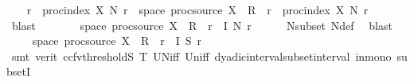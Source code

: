 \begin{isabellebody}
\ \ \isamarkupfalse%
\ {\isachardoublequoteopen}{\isacharparenleft}{\kern0pt}{\isasymUnion}r\ {\isasymin}\ proc{\isacharunderscore}{\kern0pt}index\ X{\isachardot}{\kern0pt}\ N\ r{\isacharparenright}{\kern0pt}\ {\isasymsubseteq}\ {\isacharparenleft}{\kern0pt}space\ {\isacharparenleft}{\kern0pt}proc{\isacharunderscore}{\kern0pt}source\ X{\isacharparenright}{\kern0pt}\ {\isacharminus}{\kern0pt}\ R{\isacharparenright}{\kern0pt}\ {\isasymunion}\ {\isacharparenleft}{\kern0pt}{\isasymUnion}r\ {\isasymin}\ proc{\isacharunderscore}{\kern0pt}index\ X{\isachardot}{\kern0pt}\ N\ r{\isacharparenright}{\kern0pt}{\isachardoublequoteclose}\isanewline
\ \ \ \ \isamarkupfalse%
\ blast\isanewline
\ \ \isamarkupfalse%
\ \isamarkupfalse%
\ {\isachardoublequoteopen}{\isachardot}{\kern0pt}{\isachardot}{\kern0pt}{\isachardot}{\kern0pt}\ {\isasymsubseteq}\ {\isacharparenleft}{\kern0pt}space\ {\isacharparenleft}{\kern0pt}proc{\isacharunderscore}{\kern0pt}source\ X{\isacharparenright}{\kern0pt}\ {\isacharminus}{\kern0pt}\ R{\isacharparenright}{\kern0pt}\ {\isasymunion}\ {\isacharparenleft}{\kern0pt}{\isasymUnion}r\ {\isasymin}\ {\isacharquery}{\kern0pt}I{\isachardot}{\kern0pt}\ N\ r{\isacharparenright}{\kern0pt}{\isachardoublequoteclose}\isanewline
\ \ \ \ \isamarkupfalse%
\ N{\isacharunderscore}{\kern0pt}subset\ N{\isacharunderscore}{\kern0pt}def\ \isamarkupfalse%
\ blast\isanewline
\ \ \isamarkupfalse%
\ \isamarkupfalse%
\ {\isachardoublequoteopen}{\isachardot}{\kern0pt}{\isachardot}{\kern0pt}{\isachardot}{\kern0pt}\ {\isasymsubseteq}\ {\isacharparenleft}{\kern0pt}space\ {\isacharparenleft}{\kern0pt}proc{\isacharunderscore}{\kern0pt}source\ X{\isacharparenright}{\kern0pt}\ {\isacharminus}{\kern0pt}\ R{\isacharparenright}{\kern0pt}\ {\isasymunion}\ {\isacharparenleft}{\kern0pt}{\isasymUnion}r\ {\isasymin}\ {\isacharquery}{\kern0pt}I{\isachardot}{\kern0pt}\ S\ r{\isacharparenright}{\kern0pt}{\isachardoublequoteclose}\isanewline
\ \ \ \ \isamarkupfalse%
\ {\isacharparenleft}{\kern0pt}smt\ {\isacharparenleft}{\kern0pt}verit{\isacharcomma}{\kern0pt}\ ccfv{\isacharunderscore}{\kern0pt}threshold{\isacharparenright}{\kern0pt}S\ T{\isacharparenleft}{\kern0pt}{}{\isacharparenright}{\kern0pt}\ UN{\isacharunderscore}{\kern0pt}iff\ Un{\isacharunderscore}{\kern0pt}iff\ dyadic{\isacharunderscore}{\kern0pt}interval{\isacharunderscore}{\kern0pt}subset{\isacharunderscore}{\kern0pt}interval\ in{\isacharunderscore}{\kern0pt}mono\ subsetI{\isacharparenright}{\kern0pt}\isanewline

\end{isabellebody}
